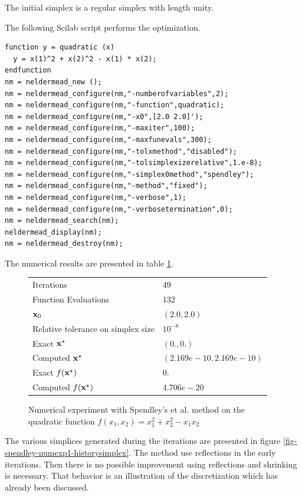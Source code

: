 The initial simplex is a regular simplex with length unity.

The following Scilab script performs the optimization.

\lstset{language=scilabscript}
\begin{lstlisting}
function y = quadratic (x)
  y = x(1)^2 + x(2)^2 - x(1) * x(2);
endfunction
nm = neldermead_new ();
nm = neldermead_configure(nm,"-numberofvariables",2);
nm = neldermead_configure(nm,"-function",quadratic);
nm = neldermead_configure(nm,"-x0",[2.0 2.0]');
nm = neldermead_configure(nm,"-maxiter",100);
nm = neldermead_configure(nm,"-maxfunevals",300);
nm = neldermead_configure(nm,"-tolxmethod","disabled");
nm = neldermead_configure(nm,"-tolsimplexizerelative",1.e-8);
nm = neldermead_configure(nm,"-simplex0method","spendley");
nm = neldermead_configure(nm,"-method","fixed");
nm = neldermead_configure(nm,"-verbose",1);
nm = neldermead_configure(nm,"-verbosetermination",0);
nm = neldermead_search(nm);
neldermead_display(nm);
nm = neldermead_destroy(nm);
\end{lstlisting}


The numerical results are presented in table \ref{fig-spendley-numexp1-table}.

\begin{figure}[htbp]
\begin{center}
\begin{tabular}{|l|l|}
\hline
Iterations & 49 \\
Function Evaluations & 132 \\
$\mathbf{x}_0$ & $(2.0,2.0)$ \\
Relative tolerance on simplex size & $10^{-8}$ \\
Exact $\mathbf{x}^\star$ & $(0.,0.)$\\
Computed $\mathbf{x}^\star$ & $(2.169e-10, 2.169e-10)$\\
Exact $f(\mathbf{x}^\star)$ & $0.$\\
Computed $f(\mathbf{x}^\star)$ & $4.706e-20$\\
\hline
\end{tabular}
\end{center}
\caption{Numerical experiment with Spendley's et al. method on the quadratic function
$f(x_1,x_2) = x_1^2 + x_2^2 - x_1 x_2$}
\label{fig-spendley-numexp1-table}
\end{figure}

The various simplices generated during the iterations are 
presented in figure \ref{fig-spendley-numexp1-historysimplex}.
The method use reflections in the early iterations. Then there
is no possible improvement using reflections and shrinking is necessary.
That behavior is an illustration of the discretization which has already
been discussed.

